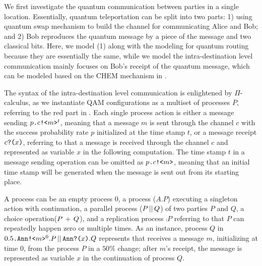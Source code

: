 We first investigate the quantum communication between parties in a single location.
Essentially, quantum teleportation can be split into two parts: 1) using quantum swap mechanism to build the channel for communicating Alice and Bob; and 2) Bob reproduces the quantum message by a piece of the message and two classical bits.
Here, we model (1) along with the modeling for quantum routing because they are essentially the same, while we model the intra-destination level communication mainly focuses on Bob's receipt of the quantum message, which can be modeled based on the CHEM mechanism in .

The syntax of the intra-destination level communication is enlightened by $\Pi$-calculus, as we instantiate QAM configurations as a multiset of processes $\overline{P}$, referring to the red part in .
Each single process action is either a message sending $p\texttt{.}c\texttt{!<}m\texttt{>}^{t}$, meaning that a message $m$ is sent through the channel $c$ with the success probability rate $p$ initialized at the time stamp $t$, or a message receipt $c\texttt{?(}x\texttt{)}$, referring to that a message is received through the channel $c$ and represented as variable $x$ in the following computation.
The time stamp $t$ in a message sending operation can be omitted as $p\texttt{.}c\texttt{!<}m\texttt{>}$, meaning that an initial time stamp will be generated when the message is sent out from its starting place.

A process can be an empty process $0$, a process ($A.P$) executing a singleton action with continuation, a parallel process ($P\,||\,Q$) of two parties $P$ and $Q$, a choice operation($P\,+\,Q$), and a replication process $\comp{P}$ referring to that $P$ can repeatedly happen zero or multiple times. As an instance, process $Q$ in $0.5\texttt{.}\texttt{Ann}\texttt{!<}m\texttt{>}^0.P\,||\,\texttt{Ann}\texttt{?(}x\texttt{)}.Q$ represents that  receives a message $m$, initializing at time $0$, from the process $P$ in a $50\%$ change; after $m$'s receipt, the message is represented as variable $x$ in the continuation of process $Q$.

